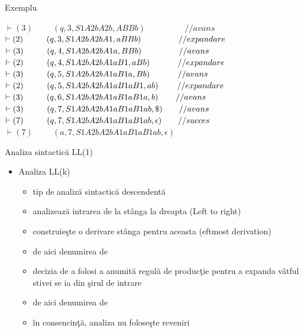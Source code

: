 \documentclass[pdf]{beamer}
\begin{document}
\begin{frame}{Exemplu}

$\vdash  (3)\hspace{1cm}	(q, 3, S1A2bA2b, ABBb)	      \hspace{2cm}    //avans	$
$\vdash  (2)\hspace{1cm}	(q, 3, S1A2bA2bA1, aBBb)      \hspace{1.6cm}  //expandare$
$\vdash  (3)\hspace{1cm}	(q, 4, S1A2bA2bA1a, BBb)      \hspace{1.6cm}  //avans$
$\vdash  (2)\hspace{1cm}	(q, 4, S1A2bA2bA1aB1, aBb)    \hspace{1.2cm}  //expandare$
$\vdash  (3)\hspace{1cm}	(q, 5, S1A2bA2bA1aB1a, Bb)    \hspace{1.2cm}  //avans$
$\vdash  (2)\hspace{1cm}	(q, 5, S1A2bA2bA1aB1aB1, ab)  \hspace{0.8cm}  //expandare$
$\vdash  (3)\hspace{1cm}	(q, 6, S1A2bA2bA1aB1aB1a, b)  \hspace{0.75cm}  //avans$
$\vdash  (3)\hspace{1cm}	(q, 7, S1A2bA2bA1aB1aB1ab, \$)\hspace{0.7cm}  //avans$
$\vdash  (7)\hspace{1cm}	(q, 7, S1A2bA2bA1aB1aB1ab, \epsilon) \hspace{0.7cm} //succes$
$\vdash  (7)\hspace{1cm}	(a, 7, S1A2bA2bA1aB1aB1ab, \epsilon)$

\end{frame}



\begin{frame}{Analiza sintactică LL(1)}
\begin{itemize}
\item
Analiza LL(k) 
\begin{itemize}
\item
tip de analiză sintactică descendentă
\item
analizează intrarea de la stânga la dreapta (\color{red}L\color{black}eft to right)
\item
construieşte o derivare stânga pentru aceasta (\color{red}{L}\color{black}eftmost derivation)
\item
de aici denumirea de \color{red}{LL}\color{black}
\item
decizia de a folosi a anumită regulă de producţie pentru a expanda vâtful stivei se ia \color{red}{după inspectarea în avans a unui număr de k atomi lexicali} \color{black} din şirul de intrare
\item
de aici denumirea de \color{red}{LL(k)}\color{black}
\item
în consencinţă, analiza nu foloseşte reveniri
\end{itemize}
\end{itemize}
\end{frame}
\end{document}
